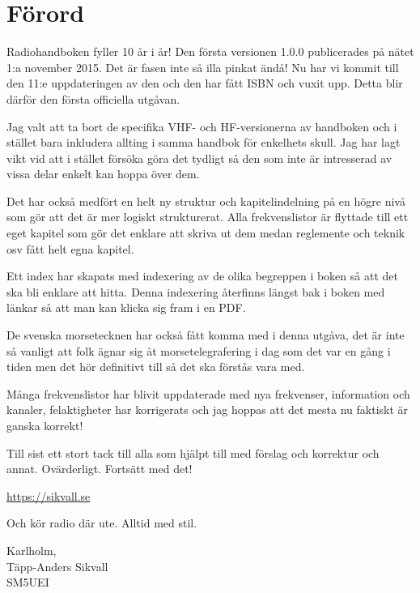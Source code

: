 
\section*{Förord}

Radiohandboken fyller 10 år i år! Den första versionen 1.0.0 publicerades på
nätet 1:a november 2015. Det är fasen inte så illa pinkat ändå! Nu har vi
kommit till den 11:e uppdateringen av den och den har fått ISBN och vuxit upp.
Detta blir därför den första officiella utgåvan.

Jag valt att ta bort de specifika VHF- och HF-versionerna av handboken och i
stället bara inkludera allting i samma handbok för enkelhets skull. Jag har
lagt vikt vid att i stället försöka göra det tydligt så den som inte är
intresserad av vissa delar enkelt kan hoppa över dem.

Det har också medfört en helt ny struktur och kapitelindelning på en högre
nivå som gör att det är mer logiskt strukturerat. Alla frekvenslistor är
flyttade till ett eget kapitel som gör det enklare att skriva ut dem medan
reglemente och teknik osv fått helt egna kapitel.

Ett index har skapats med indexering av de olika begreppen i boken så att det
ska bli enklare att hitta. Denna indexering återfinns längst bak i boken med
länkar så att man kan klicka sig fram i en PDF.

De svenska morsetecknen har också fått komma med i denna utgåva, det är inte
så vanligt att folk ägnar sig åt morsetelegrafering i dag som det var en gång
i tiden men det hör definitivt till så det ska förstås vara med.

Många frekvenslistor har blivit uppdaterade med nya frekvenser, information
och kanaler, felaktigheter har korrigerats och jag hoppas att det mesta nu
faktiskt är ganska korrekt!

Till sist ett stort tack till alla som hjälpt till med förslag och korrektur
och annat. Ovärderligt. Fortsätt med det!

\url{https://sikvall.se}

Och kör radio där ute. Alltid med stil.

\vspace{4mm}

\noindent Karlholm, \DokumentDatum\\
Täpp-Anders Sikvall\\
	SM5UEI

\vspace{\fill}

